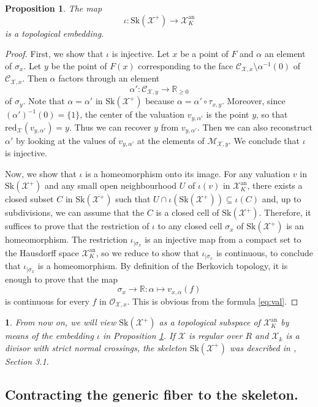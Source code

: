 \documentclass{amsart}%
\numberwithin{equation}{subsection}
\theoremstyle{plain2}
\newtheorem{prop}[equation]{Proposition}
\theoremstyle{definition2}
\theoremstyle{stepstyle}
\theoremstyle{point}
\theoremstyle{subpoint}
\newtheorem{subpoint}[equation]{}%
\newcommand{\spa}[1]{\begin{subpoint}#1\end{subpoint}}           %
\newcommand{\R}{\ensuremath{\mathbb{R}}}
\newcommand{\cX}{\ensuremath{\mathscr{X}}}
\renewcommand{\R}{\ensuremath{\mathbb{R}}}
\newcommand{\redu}{\mathrm{red}}
\newcommand{\an}{\mathrm{an}}
\newcommand{\Sk}{\mathrm{Sk}}
\begin{document}
\begin{prop}\label{prop-embed}
The map $$\iota:\Sk(\cX^+)\to\cX_K^\an$$  is a
topological embedding.
\end{prop}
\begin{proof}
First, we show that $\iota$ is injective. Let $x$ be a point of $F$ and $\alpha$ an element of $\sigma_x$. Let $y$ be the point of $F(x)$ corresponding to the face $\mathcal{C}_{\cX,x}\setminus
\alpha^{-1}(0)$ of $\mathcal{C}_{\cX,x}$. Then $\alpha$ factors through an element
$$\alpha':\mathcal{C}_{\cX,y}\to \R_{\geqslant 0}$$ of $\sigma_y$.  Note that $\alpha=\alpha'$ in $\Sk(\cX^+)$ because $\alpha=\alpha'\circ \tau_{x,y}$.
Moreover, since $(\alpha')^{-1}(0)=\{1\}$, the center of the valuation $v_{y,\alpha'}$ is the point $y$, so that $\redu_{\cX}(v_{y,\alpha'})=y$. Thus we can recover $y$ from $v_{y,\alpha'}$. Then we can also reconstruct $\alpha'$ by looking at the values of $v_{y,\alpha'}$ at the elements of $\mathcal{M}_{\cX,y}$. We conclude that $\iota$ is injective.

Now, we show that $\iota$ is a homeomorphism onto its image. For any valuation $v$ in $\Sk(\cX^+)$ and any small open neighbourhood $U$ of $\iota(v)$ in $\cX_K^\an$, there exists a closed subset $C$ in $\Sk(\cX^+)$ such that $U \cap \iota(\Sk(\cX^+))\subseteq \iota(C)$ and, up to subdivisions, we can assume that the $C$ is a closed cell of $\Sk(\cX^+)$. Therefore, it suffices to prove that the restriction of $\iota$ to any closed cell $\sigma_x$ of $\Sk(\cX^+)$ is an homeomorphism. The restriction $\iota_{|\sigma_x}$ is an injective map from a compact set to the Hausdorff space $\cX_K^\an$, so we reduce to show that $\iota_{|\sigma_x}$ is continuous, to conclude that $\iota_{|\sigma_x}$ is a homeomorphism. By definition of the Berkovich topology, it is enough to prove that the map $$\sigma_x\to \R:\alpha\mapsto v_{x,\alpha}(f)$$ is continuous for every $f$ in $\mathcal{O}_{\cX,x}$. This is obvious from the formula \eqref{eq:val}. 
\end{proof}

\spa{From now on, we will view $\Sk(\cX^+)$ as a topological subspace of $\cX_K^{\an}$ by means of the embedding $\iota$ in Proposition \ref{prop-embed}. If $\cX$ is regular over $R$ and $\cX_k$ is a divisor with strict normal crossings, the skeleton $\Sk(\cX^+)$ was described in \cite{MustataNicaise}, Section 3.1.}

\subsection{Contracting the generic fiber to the skeleton.}
\end{document}
